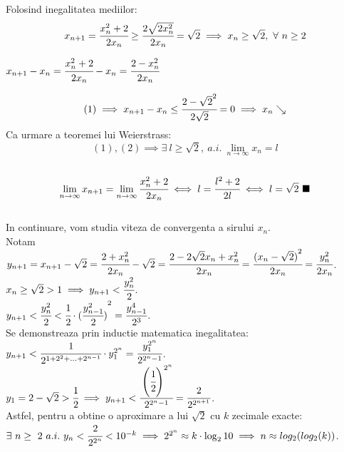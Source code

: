\documentclass{article}
\begin{document}
        Folosind inegalitatea mediilor:\\
        \begin{equation}
            x_{n+1} = \cfrac{x_n^2+2}{2x_n} \geq \cfrac{2\sqrt{2x_n^2}}{2x_n}=\sqrt{2} \implies x_n \geq \sqrt{2},\ \forall\ n \geq 2
        \end{equation}
        \begin{center}
            $x_{n+1}-x_n = \cfrac{x_n^2+2}{2x_n} - x_n = \cfrac{2-x_n^2}{2x_n}$\\
        \end{center}
        \begin{equation}
            (1) \implies x_{n+1}-x_n \leq \cfrac{2-\sqrt{2}^2}{2\sqrt{2}} = 0 \implies x_n \searrow
        \end{equation}
        Ca urmare a teoremei lui Weierstrass:\\ $$(1),(2) \implies \exists\ l \geq \sqrt{2},\ a.i.\ \lim_{n\to\infty} x_n = l$$\\
        $$\lim_{n\to\infty}x_{n+1} = \lim_{n\to\infty} \cfrac{x_n^2+2}{2x_n} \iff l = \cfrac{l^2+2}{2l} \iff l=\sqrt{2}\ \blacksquare$$\\
        In continuare, vom studia viteza de convergenta a sirului $x_n$.\\
        Notam $y_{n+1} = x_{n+1}-\sqrt{2} = \cfrac{2+x_n^2}{2x_n}-\sqrt{2} = \cfrac{2 -2\sqrt{2}x_n+x_n^2}{2x_n}=\cfrac{{(x_n-\sqrt{2})}^2}{2x_n} = \cfrac{y_n^2}{2x_n}$.\\
        $x_n \geq \sqrt{2} > 1 \implies y_{n+1} < \cfrac{y_n^2}{2}$.\\
        $y_{n+1} < \cfrac{y_n^2}{2} < \cfrac{1}{2}\cdot{(\cfrac{y_{n-1}^2}{2})}^2 = \cfrac{y_{n-1}^4}{2^3}$.\\
        Se demonstreaza prin inductie matematica inegalitatea:\\
        $y_{n+1}<\cfrac{1}{2^{1+2^2+...+2^{n-1}}}\cdot y_1^{2^n} = \cfrac{y_1^{2^n}}{2^{2^n-1}}$.\\
        $y_1 = 2-\sqrt{2} > \cfrac{1}{2} \implies y_{n+1} < \cfrac{\left(\cfrac{1}{2}\right)^{2^n}}{2^{2^n-1}} = \cfrac{2}{2^{2^{n+1}}}$.\\
        Astfel, pentru a obtine o aproximare a lui $\sqrt{2}$ cu $k$ zecimale exacte:\\ $\exists\ n \geq\ 2\ a.i.\ y_n < \cfrac{2}{2^{2^n}} < 10^{-k} \implies 2^{2^n} \approx k\cdot\log_2{10} \implies n \approx log_2(log_2(k))$.\\
\end{document}
